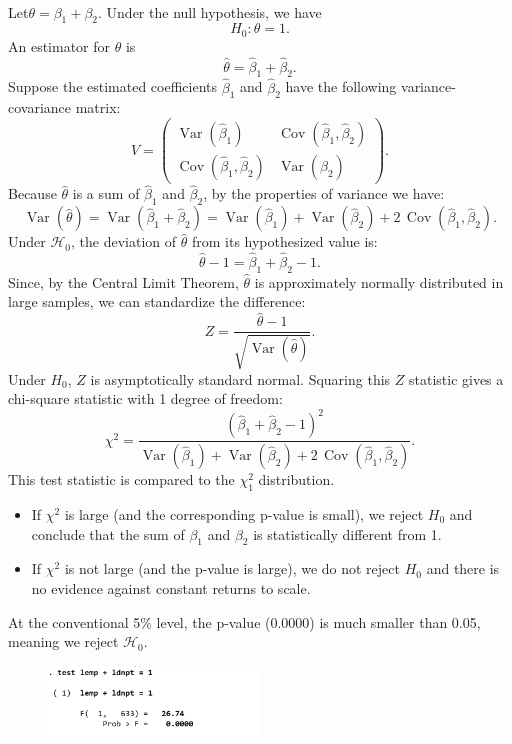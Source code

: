 \documentclass[a4paper,12pt]{article} %
\theoremstyle{nonitalic}
\newenvironment{solution}[1]
  {\renewcommand\theinnercustomsol{#1}\innercustomsol}
  {\endinnercustomsol}
\newcounter{solutionctr}
\renewcommand{\thesolutionctr}{(\alph{solutionctr})}
\newenvironment{autosolution}
  {\stepcounter{solutionctr}\begin{solution}{\thesolutionctr}}
  {\end{solution}}
\begin{document}
\begin{autosolution}
    \

    Let$\theta = \beta_1 + \beta_2$. Under the null hypothesis, we have
    \[
    H_0: \theta = 1.
    \]
    An estimator for $\theta$ is
    \[
    \hat{\theta} = \hat{\beta}_1 + \hat{\beta}_2.
    \]
    Suppose the estimated coefficients $\hat{\beta}_1$ and $\hat{\beta}_2$ have the following variance-covariance matrix:
    \[
    V = \begin{pmatrix}
    \operatorname{Var}(\hat{\beta}_1) & \operatorname{Cov}(\hat{\beta}_1, \hat{\beta}_2) \\
    \operatorname{Cov}(\hat{\beta}_1, \hat{\beta}_2) & \operatorname{Var}(\hat{\beta}_2)
    \end{pmatrix}.
    \]
    Because $\hat{\theta}$ is a sum of $\hat{\beta}_1$ and $\hat{\beta}_2$, by the properties of variance we have:
    \[
    \operatorname{Var}(\hat{\theta}) = \operatorname{Var}(\hat{\beta}_1 + \hat{\beta}_2) = \operatorname{Var}(\hat{\beta}_1) + \operatorname{Var}(\hat{\beta}_2) + 2\,\operatorname{Cov}(\hat{\beta}_1, \hat{\beta}_2).
    \]
    Under $\mathcal{H}_0$, the deviation of $\hat{\theta}$ from its hypothesized value is:
    \[
    \hat{\theta} - 1 = \hat{\beta}_1 + \hat{\beta}_2 - 1.
    \]
    Since, by the Central Limit Theorem, $\hat{\theta}$ is approximately normally distributed in large samples, we can standardize the difference:
    \[
    Z = \frac{\hat{\theta} - 1}{\sqrt{\operatorname{Var}(\hat{\theta})}}.
    \]
    Under $H_0$, $Z$ is asymptotically standard normal. Squaring this $Z$ statistic gives a chi-square statistic with 1 degree of freedom:
    \[
    \chi^2 = \frac{(\hat{\beta}_1 + \hat{\beta}_2 - 1)^2}{\operatorname{Var}(\hat{\beta}_1) + \operatorname{Var}(\hat{\beta}_2) + 2\,\operatorname{Cov}(\hat{\beta}_1, \hat{\beta}_2)}.
    \]
    This test statistic is compared to the $\chi^2_1$ distribution.
    \begin{itemize}
        \item If $\chi^2$ is large (and the corresponding p-value is small), we reject $H_0$ and conclude that the sum of $\beta_1$ and $\beta_2$ is statistically different from 1.  
        \item If $\chi^2$ is not large (and the p-value is large), we do not reject $H_0$ and there is no evidence against constant returns to scale.
    \end{itemize}

    At the conventional 5\% level, the p-value (0.0000) is much smaller than 0.05, meaning we reject $\mathcal{H}_0$.
    \begin{figure}[htbp!]
        \centering
        \includegraphics[width=0.5\textwidth]{F_test.png}
    \end{figure}
\end{autosolution}
\end{document}

